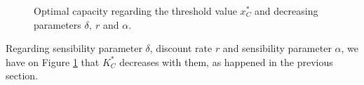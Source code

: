 \begin{figure}[!htb]
	\begin{subfigmatrix}{3}
	\end{subfigmatrix}
	\caption{Optimal capacity regarding the threshold value $x^*_C$ and decreasing parameters $\delta, \ r$ and $\alpha$.}
	\label{fig:2_k3}
\end{figure}

Regarding  sensibility parameter $\delta$, discount rate $r$ and sensibility parameter $\alpha$, we have on Figure \ref{fig:2_k3} that $K^*_C$ decreases with them, as happened in the previous section.



